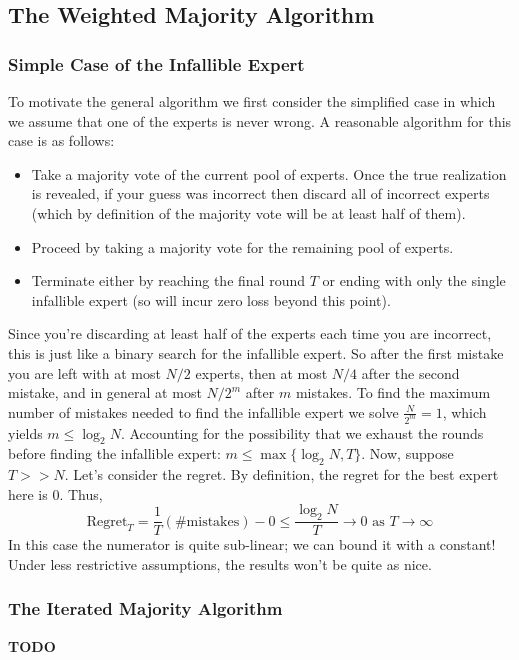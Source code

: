 \documentclass[12pt]{article}
\begin{document}
\subsection{The Weighted Majority Algorithm}

\subsubsection{Simple Case of the Infallible Expert}
To motivate the general algorithm we first consider the simplified case in which we assume that one of the experts is never wrong. A reasonable algorithm for this case is as follows: 
\begin{itemize}
\item Take a majority vote of the current pool of experts. Once the true realization is revealed, if your guess was incorrect then discard all of incorrect experts (which by definition of the majority
vote will be at least half of them). 
\item Proceed by taking a majority vote for the remaining pool of experts. 
\item Terminate either by reaching the final round $T$ or ending with only the single infallible expert (so will incur zero loss beyond this point). 
\end{itemize}
Since you're discarding at least half of the experts each time you are incorrect, this is just like a binary search for the infallible expert. So after the first mistake you are left with at most
$N/2$ experts, then at most $N/4$ after the second mistake, and in general at most $N/2^m$ after $m$ mistakes. To find the maximum number of mistakes needed to find the infallible expert
we solve $\frac{N}{2^m} = 1$, which yields $m \leq \log_2 N$. Accounting for the possibility that we exhaust the rounds before finding the infallible expert: $m \leq \max\{\log_2 N, T\}$. 
Now, suppose $T >> N$. Let's consider the regret. By definition, the regret for the best expert here is $0$. Thus, 
\[\text{Regret}_T = \frac{1}{T}(\text{\# mistakes}) - 0 \leq \frac{\log_2 N}{T} \to 0 \text{ as } T \to \infty \]
In this case the numerator is quite sub-linear; we can bound it with a constant! Under less restrictive assumptions, the results won't be quite as nice. 

\subsubsection{The Iterated Majority Algorithm}
\textbf{TODO}
\end{document}
